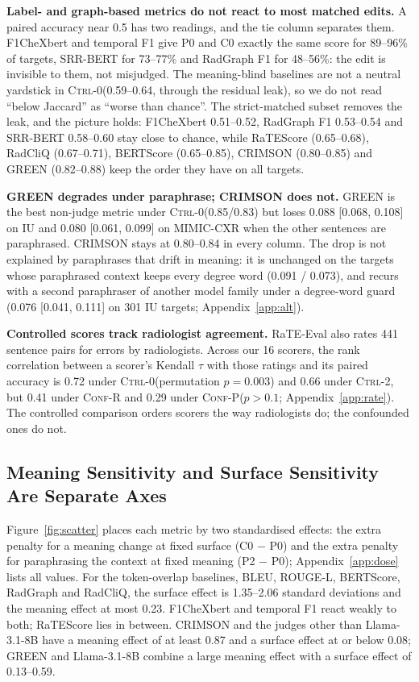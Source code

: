 \documentclass[11pt]{article}
\newcommand{\ctrlz}{\textsc{Ctrl-0}\xspace}
\newcommand{\ctrlt}{\textsc{Ctrl-2}\xspace}
\newcommand{\confr}{\textsc{Conf-R}\xspace}
\newcommand{\confp}{\textsc{Conf-P}\xspace}
\begin{document}
\textbf{Label- and graph-based metrics do not react to most matched edits.} A paired accuracy near 0.5 has two readings, and the tie column separates them. F1CheXbert and temporal F1 give P0 and C0 exactly the same score for 89--96\% of targets, SRR-BERT for 73--77\% and RadGraph F1 for 48--56\%: the edit is invisible to them, not misjudged. The meaning-blind baselines are not a neutral yardstick in \ctrlz (0.59--0.64, through the residual leak), so we do not read ``below Jaccard'' as ``worse than chance''. The strict-matched subset removes the leak, and the picture holds: F1CheXbert 0.51--0.52, RadGraph F1 0.53--0.54 and SRR-BERT 0.58--0.60 stay close to chance, while RaTEScore (0.65--0.68), RadCliQ (0.67--0.71), BERTScore (0.65--0.85), CRIMSON (0.80--0.85) and GREEN (0.82--0.88) keep the order they have on all targets.

\textbf{GREEN degrades under paraphrase; CRIMSON does not.} GREEN is the best non-judge metric under \ctrlz (0.85/0.83) but loses 0.088 [0.068, 0.108] on IU and 0.080 [0.061, 0.099] on MIMIC-CXR when the other sentences are paraphrased. CRIMSON stays at 0.80--0.84 in every column. The drop is not explained by paraphrases that drift in meaning: it is unchanged on the targets whose paraphrased context keeps every degree word (0.091 / 0.073), and recurs with a second paraphraser of another model family under a degree-word guard (0.076 [0.041, 0.111] on 301 IU targets; Appendix~\ref{app:alt}).

\textbf{Controlled scores track radiologist agreement.} RaTE-Eval also rates 441 sentence pairs for errors by radiologists. Across our 16 scorers, the rank correlation between a scorer's Kendall $\tau$ with those ratings and its paired accuracy is 0.72 under \ctrlz (permutation $p{=}0.003$) and 0.66 under \ctrlt, but 0.41 under \confr and 0.29 under \confp ($p{>}0.1$; Appendix~\ref{app:rate}). The controlled comparison orders scorers the way radiologists do; the confounded ones do not.

\subsection{Meaning Sensitivity and Surface Sensitivity Are Separate Axes}
\label{sec:axes}

Figure~\ref{fig:scatter} places each metric by two standardised effects: the extra penalty for a meaning change at fixed surface (C0 $-$ P0) and the extra penalty for paraphrasing the context at fixed meaning (P2 $-$ P0); Appendix~\ref{app:dose} lists all values. For the token-overlap baselines, BLEU, ROUGE-L, BERTScore, RadGraph and RadCliQ, the surface effect is 1.35--2.06 standard deviations and the meaning effect at most 0.23. F1CheXbert and temporal F1 react weakly to both; RaTEScore lies in between. CRIMSON and the judges other than Llama-3.1-8B have a meaning effect of at least 0.87 and a surface effect at or below 0.08; GREEN and Llama-3.1-8B combine a large meaning effect with a surface effect of 0.13--0.59.
\end{document}

